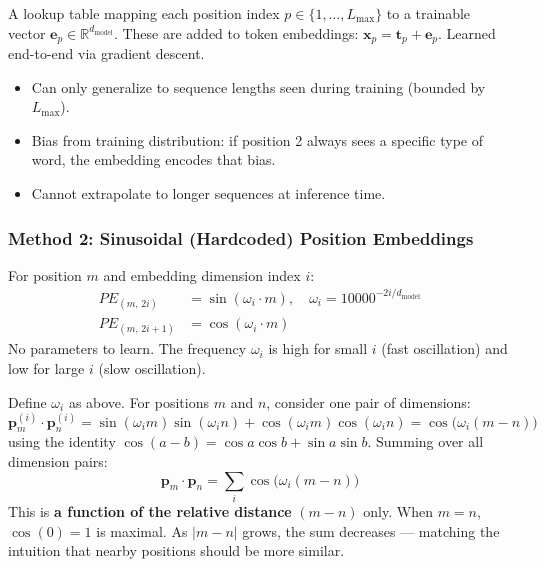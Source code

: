 \documentclass[11pt, a4paper]{article}
\begin{document}
\begin{defbox}
A lookup table mapping each position index $p \in \{1, \ldots, L_{\max}\}$ to a trainable vector $\mathbf{e}_p \in \mathbb{R}^{d_{\text{model}}}$. These are added to token embeddings: $\mathbf{x}_p = \mathbf{t}_p + \mathbf{e}_p$. Learned end-to-end via gradient descent.
\end{defbox}

\begin{warnbox}[Limitations]
\begin{itemize}[leftmargin=1.5em]
  \item Can only generalize to sequence lengths seen during training (bounded by $L_{\max}$).
  \item Bias from training distribution: if position 2 always sees a specific type of word, the embedding encodes that bias.
  \item Cannot extrapolate to longer sequences at inference time.
\end{itemize}
\end{warnbox}

\subsubsection{Method 2: Sinusoidal (Hardcoded) Position Embeddings}

\begin{defbox}
For position $m$ and embedding dimension index $i$:
\begin{align}
PE_{(m,\, 2i)} &= \sin\!\left(\omega_i \cdot m\right), \quad \omega_i = 10000^{-2i/d_{\text{model}}} \\
PE_{(m,\, 2i+1)} &= \cos\!\left(\omega_i \cdot m\right)
\end{align}
No parameters to learn. The frequency $\omega_i$ is high for small $i$ (fast oscillation) and low for large $i$ (slow oscillation).
\end{defbox}

\begin{mathbox}
Define $\omega_i$ as above. For positions $m$ and $n$, consider one pair of dimensions:
\[
\mathbf{p}_m^{(i)} \cdot \mathbf{p}_n^{(i)} = \sin(\omega_i m)\sin(\omega_i n) + \cos(\omega_i m)\cos(\omega_i n) = \cos\!\big(\omega_i(m - n)\big)
\]
using the identity $\cos(a - b) = \cos a \cos b + \sin a \sin b$. Summing over all dimension pairs:
\[
\mathbf{p}_m \cdot \mathbf{p}_n = \sum_i \cos\!\big(\omega_i(m - n)\big)
\]
This is \textbf{a function of the relative distance} $(m - n)$ only. When $m = n$, $\cos(0) = 1$ is maximal. As $|m - n|$ grows, the sum decreases --- matching the intuition that nearby positions should be more similar.
\end{mathbox}
\end{document}
